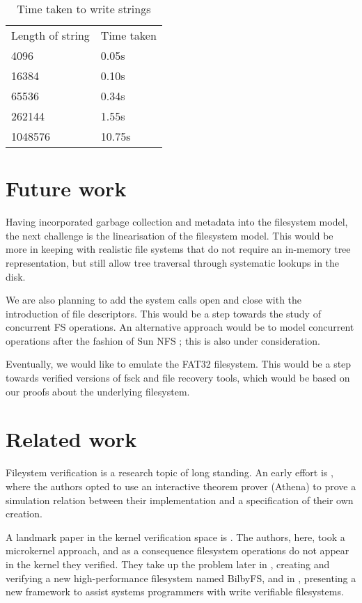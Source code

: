 \documentclass[format=sigconf,review=true]{acmart}
\begin{document}
\begin{table}[]
\centering
\caption{Time taken to write strings}
\label{write-timing-table}
\begin{tabular}{ll}
Length of string    & Time taken  \\
4096    & 0.05s  \\
16384   & 0.10s  \\
65536   & 0.34s  \\
262144  & 1.55s  \\
1048576 & 10.75s
\end{tabular}
\end{table}

\section{Future work}
Having incorporated garbage collection and metadata into the
filesystem model, the next challenge is the linearisation of the
filesystem model. This would be more in keeping
with realistic file systems that do not require an in-memory tree
representation, but still allow tree traversal through systematic
lookups in the disk.

We are also planning to add the system calls open and close with the
introduction of file descriptors. This would be a step towards the
study of concurrent FS operations. An alternative approach would be to
model concurrent operations after the fashion of Sun NFS
\cite{sandberg1985design}; this is also under consideration.

Eventually, we would like to emulate the FAT32 filesystem. This would
be a step towards verified versions of fsck and file recovery tools,
which would be based on our proofs about the underlying filesystem.

\section{Related work}
Fileystem verification is a research topic of long standing. An early
effort is \cite{arkoudas2004verifying}, where the authors opted to use
an interactive theorem prover (Athena) to prove a simulation relation
between their implementation and a specification of their own
creation.

A landmark paper in the kernel verification space is
\cite{klein2009sel4}. The authors, here, took a microkernel approach,
and as a consequence filesystem operations do not appear in the kernel
they verified. They take up the problem later in
\cite{keller2014file}, creating and verifying a new high-performance
filesystem named BilbyFS, and in \cite{amani2016cogent}, presenting a
new framework to assist systems programmers with write verifiable
filesystems.
\end{document}
